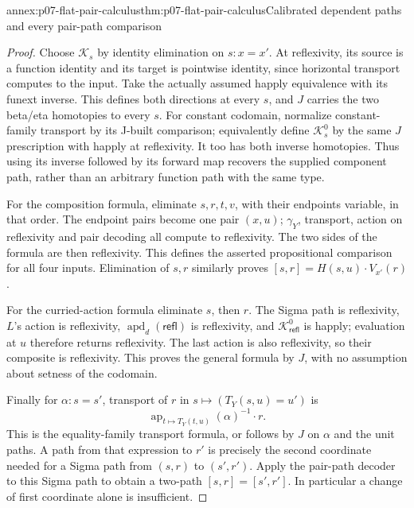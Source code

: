 \begin{annexitem}{annex:p07-flat-pair-calculus}{thm:p07-flat-pair-calculus}{Calibrated dependent paths and every pair-path comparison}
\begin{proof}
Choose \(\mathcal K_s\) by identity elimination on \(s:x=x'\).
At reflexivity, its source is a function identity and its target is
pointwise identity, since horizontal transport computes to the input.
Take the actually assumed happly equivalence with its funext inverse.
This defines both directions at every \(s\), and \(J\) carries the
two beta/eta homotopies to every \(s\).
For constant codomain, normalize constant-family transport by its
J-built comparison; equivalently define \(\mathcal K^0_s\)
by the same \(J\) prescription with happly at reflexivity.
It too has both inverse homotopies. Thus using its inverse followed
by its forward map recovers the supplied component path, rather than
an arbitrary function path with the same type.

For the composition formula, eliminate \(s,r,t,v\), with their
endpoints variable, in that order. The endpoint pairs become one
pair \((x,u)\); \(\gamma_Y\), transport, action on reflexivity and
pair decoding all compute to reflexivity. The two sides of the
formula are then reflexivity. This defines the asserted propositional
comparison for all four inputs. Elimination of \(s,r\) similarly
proves \([s,r]=H(s,u)\cdot V_{x'}(r)\).

For the curried-action formula eliminate \(s\), then \(r\).
The Sigma path is reflexivity, \(L\)'s action is reflexivity,
\(\operatorname{apd}_d(\mathsf{refl})\) is reflexivity,
and \(\mathcal K^0_{\mathsf{refl}}\) is happly; evaluation at \(u\)
therefore returns reflexivity. The last action is also reflexivity,
so their composite is reflexivity. This proves the general formula
by \(J\), with no assumption about setness of the codomain.

Finally for \(\alpha:s=s'\), transport of \(r\) in
\(s\mapsto(T_Y(s,u)=u')\) is
\[
\operatorname{ap}_{t\mapsto T_Y(t,u)}(\alpha)^{-1}\cdot r.
\]
This is the equality-family transport formula, or follows by \(J\)
on \(\alpha\) and the unit paths. A path from that expression to
\(r'\) is precisely the second coordinate needed for a Sigma path
from \((s,r)\) to \((s',r')\). Apply the pair-path decoder to this
Sigma path to obtain a two-path \([s,r]=[s',r']\).
In particular a change of first coordinate alone is insufficient.
\end{proof}
\end{annexitem}

